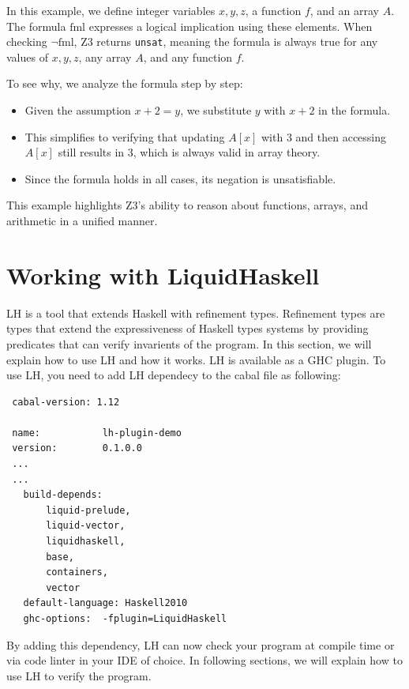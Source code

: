 \documentclass[]{rptuseminar}
\begin{document}
In this example, we define integer variables \( x, y, z \), a function \( f \), and an array \( A \). The formula \( \text{fml} \) expresses a logical implication using these elements. When checking \( \neg \text{fml} \), Z3 returns \texttt{unsat}, meaning the formula is always true for any values of \( x, y, z \), any array \( A \), and any function \( f \).

To see why, we analyze the formula step by step:
\begin{itemize}
    \item Given the assumption \( x + 2 = y \), we substitute \( y \) with \( x + 2 \) in the formula.
    \item This simplifies to verifying that updating \( A[x] \) with 3 and then accessing \( A[x] \) still results in 3, which is always valid in array theory.
    \item Since the formula holds in all cases, its negation is unsatisfiable.
\end{itemize}

This example highlights Z3’s ability to reason about functions, arrays, and arithmetic in a unified manner.
\cite{nikolaj_bjorner_programming_nodate}

\section{Working with LiquidHaskell}
\label{sec:lh}
LH is a tool that extends Haskell with refinement types. Refinement types are types that extend the expressiveness of Haskell types systems by providing predicates that can verify invarients of the program. In this section, we will explain how to use LH and how it works.
LH is available as a GHC plugin. To use LH, you need to add LH dependecy to the cabal file as following:

\vspace{1em}
\begin{lstlisting}
 cabal-version: 1.12

 name:           lh-plugin-demo
 version:        0.1.0.0
 ...
 ...
   build-depends:
       liquid-prelude,
       liquid-vector,
       liquidhaskell,
       base,
       containers,
       vector
   default-language: Haskell2010
   ghc-options:  -fplugin=LiquidHaskell
\end{lstlisting}
\vspace{1em}

By adding this dependency, LH can now check your program at compile time or via code linter in your IDE of choice. In following sections, we will explain how to use LH to verify the program.
\end{document}
